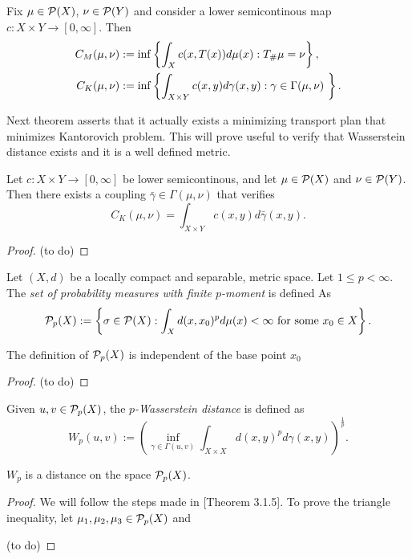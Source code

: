 \begin{definition}
    Fix $ \mu \in \mathcal P(X)$, $\nu \in \mathcal P(Y)$ and consider a lower semicontinous map $ c: X \times Y \to [0, \infty] $. Then
\begin{align*}
    C_M(\mu, \nu) &:= \inf \left\{\int_X c(x, T(x)) d\mu(x) : T_\#\mu = \nu \right\}, \\
    C_K(\mu, \nu) &:= \inf \left\{\int_{X \times Y} c(x, y) d\gamma(x,y) : \gamma \in \Gamma(\mu, \nu) \ \right\}.
\end{align*}
\end{definition}

Next theorem asserts that it actually exists a minimizing transport plan that minimizes Kantorovich problem. This will prove useful to verify that Wasserstein distance exists and it is a well defined metric.

\begin{theorem}
    Let $ c: X \times Y \to [0, \infty] $ be lower semicontinous, and let $ \mu \in \mathcal P(X) $ and $ \nu \in \mathcal P(Y) $. Then there exists a coupling $ \bar \gamma \in \Gamma(\mu, \nu) $ that verifies
    $$
    C_K(\mu, \nu) = \int_{X \times Y} c(x, y) d \bar \gamma(x,y).
    $$
\end{theorem}
\begin{proof}
    (to do)
\end{proof}

\begin{example}
    
\end{example}

\begin{definition}
    Let $ (X, d) $ be a locally compact and separable, metric space. Let $ 1 \leq p < \infty $. The {\it set of probability measures with finite $p$-moment} is defined As
    $$
        \mathcal P_p (X) := \left\{ \sigma \in \mathcal P (X) : \int_X d(x, x_0)^p d \mu (x) < \infty \text{ for some } x_0 \in X \right\}.
    $$
\end{definition}

\begin{proposition}
    The definition of $ \mathcal P_p (X) $ is independent of the base point $ x_0 $
\end{proposition}
\begin{proof}
    (to do)
\end{proof}

\begin{definition}
    Given $ u, v \in \mathcal P_p (X) $, the {\it $p$-Wasserstein distance} is defined as
    $$
        W_p(u, v) := \left( \inf_{\gamma \in \Gamma(u, v)} \int_{X \times X} d(x,y)^p d\gamma(x, y)\right)^{\frac{1}{p}}.
    $$
\end{definition}

\begin{proposition}
    $W_p$ is a distance on the space $ \mathcal P_p(X) $.
\end{proposition}

\begin{proof}
    We will follow the steps made in \cite{Figalli}[Theorem 3.1.5].
    To prove the triangle inequality, let $ \mu_1, \mu_2, \mu_3 \in \mathcal P_p(X) $ and 

    (to do)
\end{proof}